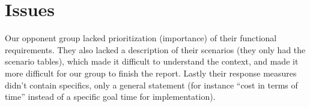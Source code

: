 \section{Issues}
\label{sec:issues}
Our opponent group lacked prioritization (importance) of their functional
requirements. They also lacked a description of their scenarios (they only had
the scenario tables), which made it difficult to understand the context, and
made it more difficult for our group to finish the report. Lastly their
response measures didn't contain specifics, only a general statement (for
instance ``cost in terms of time'' instead of a specific goal time for
implementation).
